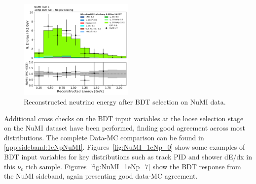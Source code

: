 \begin{figure}[H]
    \begin{center}
    \includegraphics[width=0.5\textwidth]{Sidebands/Figures/NuMI/1eNp/BDTSel/reco_e.pdf}
    \caption{Reconstructed neutrino energy after \npsel BDT selection on NuMI data.}
    \label{fig:NuMI_1eNp_reco_e}
    \end{center}
\end{figure}


Additional cross checks on the BDT input variables at the loose selection stage on the NuMI dataset have been performed, finding good agreement across most distributions. The complete Data-MC comparison can be found in \cref{app:sideband:1eNpNuMI}. Figures~\ref{fig:NuMI_1eNp_0} show some examples of BDT input variables for key distributions such as track PID and shower dE/dx in this $\nu_e$ rich sample. Figures~\ref{fig:NuMI_1eNp_7} show the BDT response from the \npsel NuMI sideband, again presenting good data-MC agreement.

